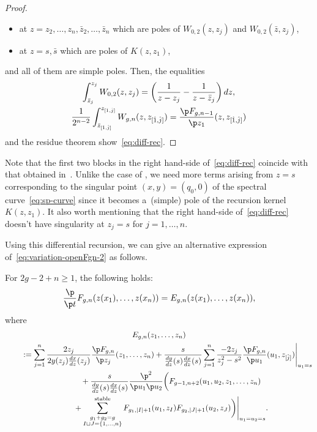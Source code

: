 \begin{proof}
\begin{itemize}
\item
at $z = z_{2}, \dots, z_{n}, \bar{z}_{2}, \dots, \bar{z}_{n}$
which are poles of $W_{0,2}(z,z_{j})$ and $W_{0,2}(\bar{z},z_{j})$,
\item
at $z = s, \bar{s}$ which are poles of $K(z,z_{1})$,
\end{itemize}
and all of them are simple poles.
Then, the equalities
\begin{gather*}
\int^{z_{j}}_{\bar{z}_{j}} W_{0,2}(z,z_{j})   =
\left(\frac{1}{z-z_{j}} - \frac{1}{z-\bar{z}_{j}} \right)dz, \\
\frac{1}{2^{n-2}}
\int^{z_{[\hat{1}, \hat{j}]}}_{\bar{z}_{[\hat{1}, \hat{j}]}}
W_{g,n}(z,z_{[\hat{1}, \hat{j}]})   =
\frac{\p F_{g,n-1}}{\p z_{1}}(z,z_{[\hat{1}, \hat{j}]})
\end{gather*}
and the residue theorem show~\eqref{eq:diff-rec}.
\end{proof}

\begin{rem} \label{rem:difference-from-DM}
Note that the f\/irst two blocks in the right hand-side
of~\eqref{eq:diff-rec} coincide with that obtained
in~\cite{DM14, DM14-2}.
Unlike the case of \cite{DM14, DM14-2},
we need more terms arising from $z=s$ corresponding
to the singular point $(x,y)=(q_{0},0)$
of the spectral curve~\eqref{eq:sp-curve}
since it becomes a~(simple) pole of
the recursion kernel $K(z,z_{1})$.
It also worth mentioning that the
right hand-side of~\eqref{eq:diff-rec} doesn't have
singularity at $z_{j} = s$ for $j=1,\dots,n$.
\end{rem}

Using this dif\/ferential recursion, we can give
an alternative expression of~\eqref{eq:variation-openFgn-2}
as follows.

\begin{thm} \label{thm:variation-of-open-free-energy}
For $2g-2+n \ge 1$, the following holds:
\begin{gather} \label{eq:t-derivative-recursion}
\frac{\p }{\p t} F_{g,n}(z(x_{1}),\dots,z(x_{n}))
= E_{g,n}(z(x_{1}),\dots,z(x_{n})),
\end{gather}
where
\begin{gather}
E_{g,n}(z_{1},\dots,z_{n}) \nonumber\\
\qquad{}
:=\sum_{j=1}^{n}
\frac{2z_{j}}{2y(z_{j})\frac{dx}{dz}(z_{j})}
\frac{\p F_{g,n}}{\p z_{j}}(z_{1},\dots,z_{n}) +
\frac{s}{\frac{dy}{dz}(s) \frac{dx}{dz}(s)}
\sum_{j=1}^{n} \frac{-2 z_{j}}{z_{j}^{2}-s^{2}}
\frac{\p F_{g,n}}{\p u_{1}}(u_{1},z_{[\hat{j}]})
\Biggr|_{u_{1}=s}
\nonumber\\
\qquad\quad{}+ \frac{s}{\frac{dy}{dz}(s) \frac{dx}{dz}(s)}
\frac{\p^{2}}{\p u_{1} \p u_{2}}
\biggl( F_{g-1,n+2}(u_{1},u_{2},z_{1},\dots,z_{n})
\nonumber\\
\qquad\quad{}+ \sum_{\substack{g_{1}+g_{2}=g \\
I \sqcup J = \{1,\dots,n\}}}^{\rm stable}
F_{g_{1}, |I|+1}(u_{1},z_{I}) F_{g_{2}, |J|+1}(u_{2}, z_{J})
\biggr)\Biggr|_{u_{1}=u_{2}=s}.\label{eq:Egn}
\end{gather}
\end{thm}

